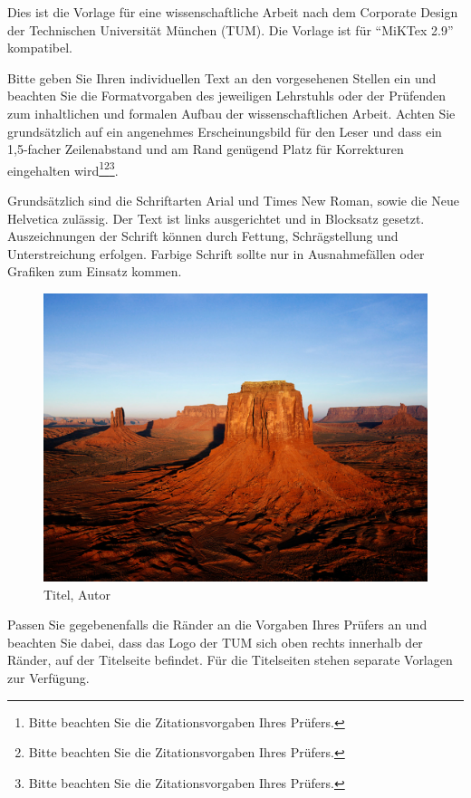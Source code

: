Dies ist die Vorlage für eine wissenschaftliche Arbeit nach dem Corporate
Design der Technischen Universität München (TUM). Die Vorlage ist für "`MiKTex 2.9"' kompatibel.

Bitte geben Sie Ihren individuellen Text an den vorgesehenen Stellen ein und
beachten Sie die Formatvorgaben des jeweiligen Lehrstuhls oder der Prüfenden
zum inhaltlichen und formalen Aufbau der wissenschaftlichen Arbeit. Achten Sie
grundsätzlich auf ein angenehmes Erscheinungsbild für den Leser und dass ein
1,5-facher Zeilenabstand und am Rand genügend Platz für Korrekturen
eingehalten wird\footnote{Bitte beachten Sie die Zitationsvorgaben Ihres
Prüfers.}\footnote{Bitte beachten Sie die Zitationsvorgaben Ihres
Prüfers.}\footnote{Bitte beachten Sie die Zitationsvorgaben Ihres
Prüfers.}.

Grundsätzlich sind die Schriftarten Arial und Times New Roman, sowie die Neue
Helvetica zulässig. Der Text ist links ausgerichtet und in Blocksatz gesetzt.
Auszeichnungen der Schrift können durch Fettung, Schrägstellung und
Unterstreichung erfolgen. Farbige Schrift sollte nur in Ausnahmefällen oder
Grafiken zum Einsatz kommen.

\begin{figure}[!ht]
\noindent\hspace{0.5mm}\includegraphics[width=12cm]{./Ressourcen/Desert.jpg}
\caption{Titel, Autor}
\end{figure}

\clearpage

Passen Sie gegebenenfalls die Ränder an die Vorgaben Ihres Prüfers an und
beachten Sie dabei, dass das Logo der TUM sich oben rechts innerhalb der
Ränder, auf der Titelseite befindet. Für die Titelseiten stehen separate
Vorlagen zur Verfügung.

